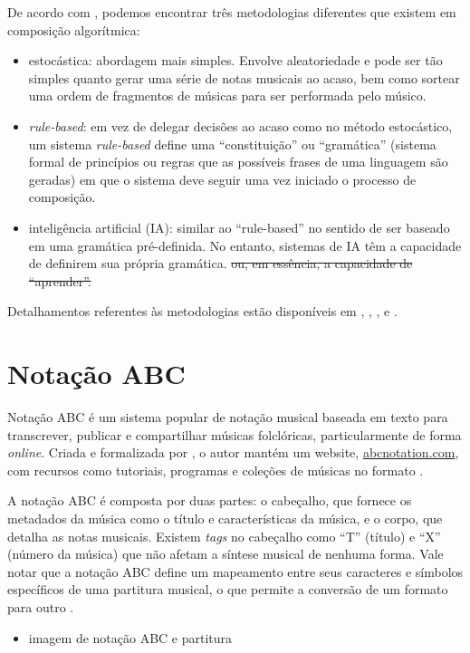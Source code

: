 \documentclass{automatextcc}
\begin{document}
De acordo com \citet{maurer}, podemos encontrar três metodologias diferentes que existem em composição algorítmica: 

\begin{itemize}
    \item estocástica: abordagem mais simples. Envolve aleatoriedade e pode ser tão simples quanto gerar uma série de notas musicais ao acaso, bem como sortear uma ordem de fragmentos de músicas para ser performada pelo músico.
    \item \textit{rule-based}: em vez de delegar decisões ao acaso como no método estocástico, um sistema \textit{rule-based} define uma ``constituição'' ou ``gramática'' (sistema formal de princípios ou regras que as possíveis frases de uma linguagem são geradas) em que o sistema deve seguir uma vez iniciado o processo de composição. 
    \item inteligência artificial (IA): similar ao ``rule-based'' no sentido de ser baseado em uma gramática pré-definida. No entanto, sistemas de IA têm a capacidade de definirem sua própria gramática. \sout{ ou, em essência, a capacidade de ``aprender''.}
\end{itemize}
Detalhamentos referentes às metodologias estão disponíveis em \citet{alpern1995}, \citet{maurer}, \citet{nierhaus2009}, \citet{fernandez2013} e \citet{hernandez2021}.  


\section{Notação ABC}
Notação ABC é um sistema popular de notação musical baseada em texto para transcrever, publicar e compartilhar músicas folclóricas, particularmente de forma \textit{online}. Criada e formalizada por \citet{walshaw1993}, o autor mantém um website, \url{abcnotation.com}, com recursos como tutoriais, programas e coleções de músicas no formato \citep{walshaw2014}.

A notação ABC é composta por duas partes: o cabeçalho, que fornece os metadados da música como o título e características da música, e o corpo, que detalha as notas musicais. Existem \textit{tags} no cabeçalho como ``T'' (título) e ``X'' (número da música) que não afetam a síntese musical de nenhuma forma. Vale notar que a notação ABC define um mapeamento entre seus caracteres e símbolos específicos de uma partitura musical, o que permite a conversão de um formato para outro \citep{agarwala2017}. 

\begin{itemize}
    \item imagem de notação ABC e partitura
\end{itemize}
\end{document}
